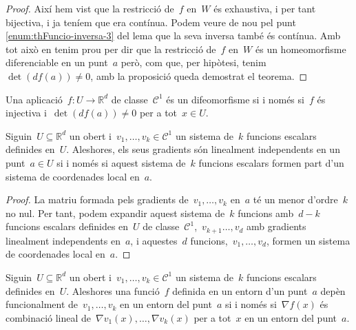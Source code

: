 \documentclass[../../main.tex]{subfiles}
\begin{document}
\begin{proof}
        Així hem vist que la restricció de~\(f\) en~\(W\) és exhaustiva, i per tant bijectiva, i ja teníem que era contínua.
        Podem veure de nou pel punt \eqref{enum:thFuncio-inversa-3} del lema  que la seva inversa també és contínua.
        Amb tot això en tenim prou per dir que la restricció de~\(f\) en~\(W\) és un homeomorfisme diferenciable en un punt~\(a\) però, com que, per hipòtesi, tenim~\(\det(df(a))\neq0\), amb la proposició  queda demostrat el teorema.
    \end{proof}
    \begin{corollary} %
        \label{cor:difeomorfisme-es-equivalent-a-ser-injectiva-i-tenir-diferencial-amb-determinant-no-nul}
        Una aplicació~\(f\colon U\to \mathbb{R}^{d}\) de classe~\(\mathcal{C}^{1}\) és un difeomorfisme si i només si~\(f\) és injectiva i~\(\det(df(a))\neq0\) per a tot~\(x\in U\).
    \end{corollary}
    \begin{proposition}
        Siguin~\(U\subseteq\mathbb{R}^{d}\) un obert i~\(v_{1},\dots,v_{k}\in\mathcal{C}^{1}\) un sistema de~\(k\) funcions escalars definides en~\(U\).
        Aleshores, els seus gradients són linealment independents en un punt~\(a\in U\) si i només si aquest sistema de~\(k\) funcions escalars formen part d'un sistema de coordenades local en~\(a\).
    \end{proposition}
    \begin{proof}
        La matriu formada pels gradients de~\(v_{1},\dots,v_{k}\) en~\(a\) té un menor d'ordre~\(k\) no nul.
        Per tant, podem expandir aquest sistema de~\(k\) funcions amb~\(d-k\) funcions escalars definides en~\(U\) de classe~\(\mathcal{C}^{1}\),~\(v_{k+1}\dots,v_{d}\) amb gradients linealment independents en~\(a\), i aquestes~\(d\) funcions,~\(v_{1},\dots,v_{d}\), formen un sistema de coordenades local en~\(a\).
    \end{proof}
    \begin{corollary}\label{corollary:dependencia-funcional-iff-dependencia-lineal-dels-gradients}
        Siguin~\(U\subseteq\mathbb{R}^{d}\) un obert i~\(v_{1},\dots,v_{k}\in\mathcal{C}^{1}\) un sistema de~\(k\) funcions escalars definides en~\(U\).
        Aleshores una funció~\(f\) definida en un entorn d'un punt~\(a\) depèn funcionalment de~\(v_{1},\dots,v_{k}\) en un entorn del punt~\(a\) si i només si~\(\nabla f(x)\) és combinació lineal de~\(\nabla v_{1}(x),\dots,\nabla v_{k}(x)\) per a tot~\(x\) en un entorn del punt~\(a\).
    \end{corollary}
\end{document}
